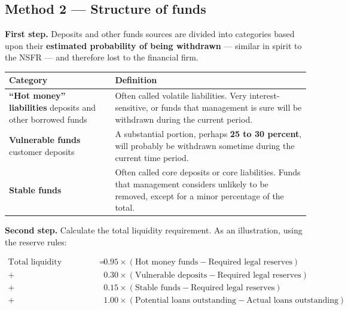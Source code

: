 \subsection{Method 2 — Structure of funds}

\textbf{First step.} Deposits and other funds sources are divided into categories based upon their \textbf{estimated probability of being withdrawn} — similar in spirit to the NSFR — and therefore lost to the financial firm.

\begin{center}
\small
\begin{tabularx}{\textwidth}{@{}p{4.6cm} X@{}}
\toprule
\rowcolor{FRMSoft}\textbf{Category} & \textbf{Definition} \\
\midrule
\textbf{``Hot money'' liabilities} \newline deposits and other borrowed funds &
Often called volatile liabilities. Very interest-sensitive, or funds that management is sure will be withdrawn during the current period. \\
\addlinespace
\textbf{Vulnerable funds} \newline customer deposits &
A substantial portion, perhaps \textbf{25 to 30 percent}, will probably be withdrawn sometime during the current time period. \\
\addlinespace
\textbf{Stable funds} &
Often called core deposits or core liabilities. Funds that management considers unlikely to be removed, except for a minor percentage of the total. \\
\bottomrule
\end{tabularx}
\end{center}

\textbf{Second step.} Calculate the total liquidity requirement. As an illustration, using the reserve rules:

\begin{lrfmlbox}
\begin{align*}
\text{Total liquidity requirement} \;=\;& 0.95 \times (\text{Hot money funds} - \text{Required legal reserves}) \\
+\;& 0.30 \times (\text{Vulnerable deposits} - \text{Required legal reserves}) \\
+\;& 0.15 \times (\text{Stable funds} - \text{Required legal reserves}) \\
+\;& 1.00 \times (\text{Potential loans outstanding} - \text{Actual loans outstanding})
\end{align*}
\end{lrfmlbox}

